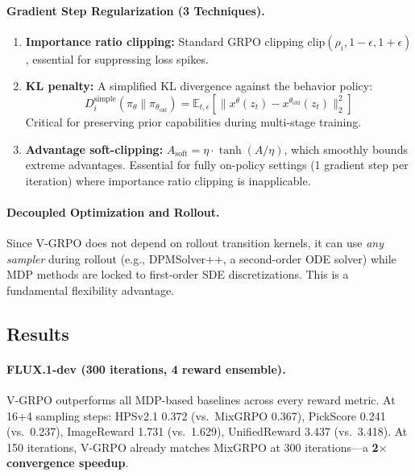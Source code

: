 \documentclass[11pt]{article}
\begin{document}
\paragraph{Gradient Step Regularization (3 Techniques).}
\begin{enumerate}
    \item \textbf{Importance ratio clipping:} Standard GRPO clipping $\mathrm{clip}(\rho_i, 1{-}\epsilon, 1{+}\epsilon)$, essential for suppressing loss spikes.
    \item \textbf{KL penalty:} A simplified KL divergence against the behavior policy:
    \begin{equation}
        D_i^{\mathrm{simple}}(\pi_\theta \| \pi_{\theta_{\mathrm{old}}}) = \mathbb{E}_{t, \epsilon}\!\left[\|x^\theta(z_t) - x^{\theta_{\mathrm{old}}}(z_t)\|_2^2\right]
    \end{equation}
    Critical for preserving prior capabilities during multi-stage training.
    \item \textbf{Advantage soft-clipping:} $A_{\mathrm{soft}} = \eta \cdot \tanh(A / \eta)$, which smoothly bounds extreme advantages. Essential for fully on-policy settings (1 gradient step per iteration) where importance ratio clipping is inapplicable.
\end{enumerate}

\paragraph{Decoupled Optimization and Rollout.}
Since V-GRPO does not depend on rollout transition kernels, it can use \emph{any sampler} during rollout (e.g., DPMSolver++, a second-order ODE solver) while MDP methods are locked to first-order SDE discretizations. This is a fundamental flexibility advantage.

\subsection{Results}

\paragraph{FLUX.1-dev (300 iterations, 4 reward ensemble).}
V-GRPO outperforms all MDP-based baselines across every reward metric. At 16+4 sampling steps: HPSv2.1 0.372 (vs.\ MixGRPO 0.367), PickScore 0.241 (vs.\ 0.237), ImageReward 1.731 (vs.\ 1.629), UnifiedReward 3.437 (vs.\ 3.418). At 150 iterations, V-GRPO already matches MixGRPO at 300 iterations---a \textbf{2$\times$ convergence speedup}.
\end{document}
